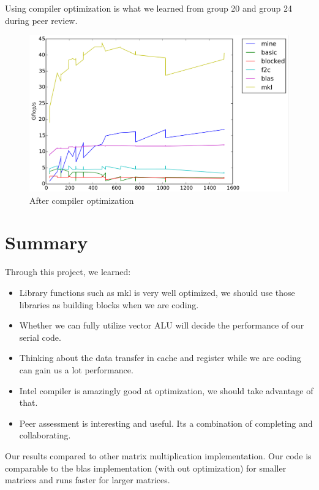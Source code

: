 \documentclass[11pt]{article}
\begin{document}
		Using compiler optimization is what we learned from group 20 and group 24 during peer review.
		
		\vspace{1cm}
		
		\begin{figure}[H]
		    	\centering
		    	\includegraphics[width=4.5in]{timing_vector_32_64_cc_cp_align.png}
		    	\caption{After compiler optimization}
		\end{figure}
		
	\clearpage	
	
	
	
	\section{Summary}
		
	Through this project, we learned:
	\begin{itemize}
		\item Library functions such as mkl is very well optimized, we should use those libraries as building blocks when we are coding.
		\item Whether we can fully utilize vector ALU will decide the performance of our serial code.
		\item Thinking about the data transfer in cache and register while we are coding can gain us a lot performance.
		\item Intel compiler is amazingly good at optimization, we should take advantage of that.
		\item Peer assessment is interesting and useful. Its a combination of completing and collaborating.
	\end{itemize}

	Our results compared to other matrix multiplication implementation. Our code is comparable to the blas implementation (with out optimization) for smaller matrices and runs faster for larger matrices.
\end{document}
